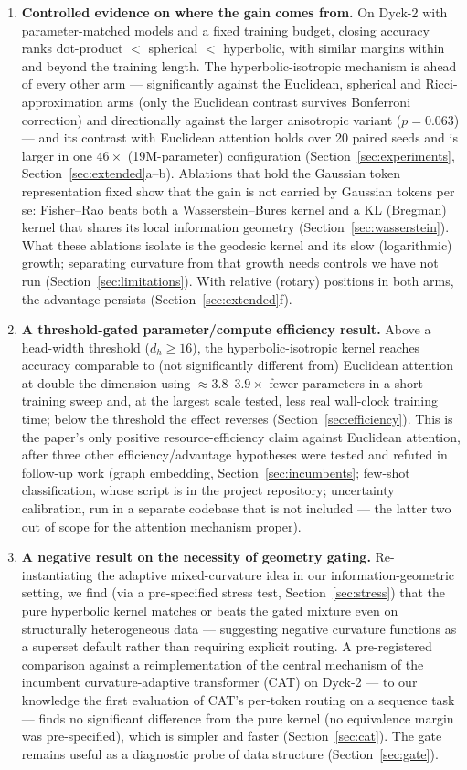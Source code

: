\documentclass[11pt]{article}
\begin{document}
\begin{enumerate}
\item \textbf{Controlled evidence on where the gain comes from.} On Dyck-2 with parameter-matched models and a fixed training budget, closing accuracy ranks dot-product $<$ spherical $<$ hyperbolic, with similar margins within and beyond the training length. The hyperbolic-isotropic mechanism is ahead of every other arm --- significantly against the Euclidean, spherical and Ricci-approximation arms (only the Euclidean contrast survives Bonferroni correction) and directionally against the larger anisotropic variant ($p = 0.063$) --- and its contrast with Euclidean attention holds over 20 paired seeds and is larger in one $46\times$ (19M-parameter) configuration (Section~\ref{sec:experiments}, Section~\ref{sec:extended}a--b). Ablations that hold the Gaussian token representation fixed show that the gain is not carried by Gaussian tokens per se: Fisher--Rao beats both a Wasserstein--Bures kernel and a KL (Bregman) kernel that shares its local information geometry (Section~\ref{sec:wasserstein}). What these ablations isolate is the geodesic kernel and its slow (logarithmic) growth; separating curvature from that growth needs controls we have not run (Section~\ref{sec:limitations}). With relative (rotary) positions in both arms, the advantage persists (Section~\ref{sec:extended}f).
\item \textbf{A threshold-gated parameter/compute efficiency result.} Above a head-width threshold ($d_h \ge 16$), the hyperbolic-isotropic kernel reaches accuracy comparable to (not significantly different from) Euclidean attention at double the dimension using $\approx 3.8$--$3.9\times$ fewer parameters in a short-training sweep and, at the largest scale tested, less real wall-clock training time; below the threshold the effect reverses (Section~\ref{sec:efficiency}). This is the paper's only positive resource-efficiency claim against Euclidean attention, after three other efficiency/advantage hypotheses were tested and refuted in follow-up work (graph embedding, Section~\ref{sec:incumbents}; few-shot classification, whose script is in the project repository; uncertainty calibration, run in a separate codebase that is not included --- the latter two out of scope for the attention mechanism proper).
\item \textbf{A negative result on the necessity of geometry gating.} Re-instantiating the adaptive mixed-curvature idea \cite{lin2025cat} in our information-geometric setting, we find (via a pre-specified stress test, Section~\ref{sec:stress}) that the pure hyperbolic kernel matches or beats the gated mixture even on structurally heterogeneous data --- suggesting negative curvature functions as a superset default rather than requiring explicit routing. A pre-registered comparison against a reimplementation of the central mechanism of the incumbent curvature-adaptive transformer (CAT) on Dyck-2 --- to our knowledge the first evaluation of CAT's per-token routing on a sequence task --- finds no significant difference from the pure kernel (no equivalence margin was pre-specified), which is simpler and faster (Section~\ref{sec:cat}). The gate remains useful as a diagnostic probe of data structure (Section~\ref{sec:gate}).

\end{enumerate}
\end{document}
